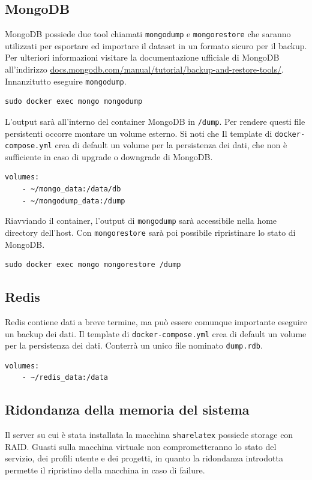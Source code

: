 \subsection{MongoDB}
MongoDB possiede due tool chiamati \verb|mongodump| e \verb|mongorestore| che saranno utilizzati per esportare ed importare il dataset in un formato sicuro per il backup. Per ulteriori informazioni visitare la documentazione ufficiale di MongoDB all'indirizzo \url{docs.mongodb.com/manual/tutorial/backup-and-restore-tools/}. Innanzitutto eseguire \verb|mongodump|.
\begin{lstlisting}
sudo docker exec mongo mongodump
\end{lstlisting}
L'output sarà all'interno del container MongoDB in \verb|/dump|. Per rendere questi file persistenti occorre montare un volume esterno. Si noti che Il template di \verb|docker-compose.yml| crea di default un volume per la persistenza dei dati, che non è sufficiente in caso di upgrade o downgrade di MongoDB.
\begin{lstlisting}
volumes:
    - ~/mongo_data:/data/db
    - ~/mongodump_data:/dump
\end{lstlisting}
Riavviando il container, l'output di \verb|mongodump| sarà accessibile nella home directory dell'host. Con \verb|mongorestore| sarà poi possibile ripristinare lo stato di MongoDB.
\begin{lstlisting}
sudo docker exec mongo mongorestore /dump
\end{lstlisting}

\subsection{Redis}
Redis contiene dati a breve termine, ma può essere comunque importante eseguire un backup dei dati. Il template di \verb|docker-compose.yml| crea di default un volume per la persistenza dei dati. Conterrà un unico file nominato \verb|dump.rdb|.
\begin{lstlisting}
volumes:
    - ~/redis_data:/data
\end{lstlisting} 

\subsection{Ridondanza della memoria del sistema}
Il server su cui è stata installata la macchina \verb|sharelatex| possiede storage con RAID. Guasti sulla macchina virtuale non comprometteranno lo stato del servizio, dei profili utente e dei progetti, in quanto la ridondanza introdotta permette il ripristino della macchina in caso di failure.

